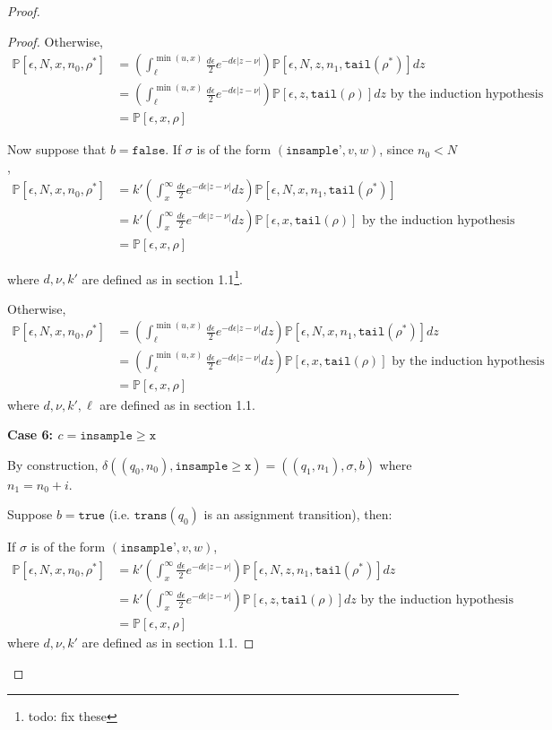 \documentclass[12pt]{article}
\newcommand{\PP}{\mathbb{P}}
\newcommand{\gguard}{\texttt{insample}\geq \texttt{x}}
\theoremstyle{definition}
\begin{document}
\begin{proof}
\begin{proof}
	Otherwise, 
	\begin{align*}
		\PP[\epsilon, N, x, n_0, \rho^*] &= \left(\int_{\ell}^{\min(u, x)}\frac{d\epsilon}{2}e^{-d\epsilon|z-\nu|}\right)\PP[\epsilon, N, z, n_1, \texttt{tail}(\rho^*)]dz \\
		&= \left(\int_{\ell}^{\min(u, x)}\frac{d\epsilon}{2}e^{-d\epsilon|z-\nu|}\right)\PP[\epsilon, z, \texttt{tail}(\rho)]dz \text{ by the induction hypothesis }\\
		&= \PP[\epsilon, x, \rho]
	\end{align*}

	Now suppose that $b = \texttt{false}$. If $\sigma$ is of the form $(\texttt{insample'}, v, w)$, since $n_0 < N$, 
	\begin{align*}
		\PP[\epsilon, N, x, n_0, \rho^*] &= k'\left(\int_x^\infty\frac{d\epsilon}{2}e^{-d\epsilon|z-\nu|}dz\right)\PP[\epsilon, N, x, n_1, \texttt{tail}(\rho^*)]\\
		&= k'\left(\int_x^\infty\frac{d\epsilon}{2}e^{-d\epsilon|z-\nu|}dz\right)\PP[\epsilon, x, \texttt{tail}(\rho)] \text{ by the induction hypothesis }\\
		&= \PP[\epsilon, x, \rho]
	\end{align*}

	where $d, \nu, k'$ are defined as in section 1.1\footnote{todo: fix these}.

	Otherwise, 
	\begin{align*}
		\PP[\epsilon, N, x, n_0, \rho^*] &= \left(\int_{\ell}^{\min(u, x)}\frac{d\epsilon}{2}e^{-d\epsilon|z-\nu|}dz\right)\PP[\epsilon, N, x, n_1, \texttt{tail}(\rho^*)]dz \\
		&= \left(\int_{\ell}^{\min(u, x)}\frac{d\epsilon}{2}e^{-d\epsilon|z-\nu|}dz\right)\PP[\epsilon, x, \texttt{tail}(\rho)] \text{ by the induction hypothesis }\\
		&= \PP[\epsilon, x, \rho]
	\end{align*}
	where $d, \nu, k', \ell$ are defined as in section 1.1.

	\textbf{Case 6: $c = \gguard$}
	
	By construction, $\delta((q_0, n_0), \gguard) = ((q_1, n_1), \sigma, b)$ where $n_1 = n_0+i$. 

	Suppose $b = \texttt{true}$ (i.e. $\texttt{trans}(q_0)$ is an assignment transition), then:

	If $\sigma$ is of the form $(\texttt{insample'}, v, w)$, 
		\begin{align*}
			\PP[\epsilon, N, x, n_0, \rho^*] &= k'\left(\int_x^\infty\frac{d\epsilon}{2}e^{-d\epsilon|z-\nu|}\right)\PP[\epsilon, N, z, n_1, \texttt{tail}(\rho^*)]dz \\
			&= k'\left(\int_x^\infty\frac{d\epsilon}{2}e^{-d\epsilon|z-\nu|}\right)\PP[\epsilon, z, \texttt{tail}(\rho)]dz \text{ by the induction hypothesis }\\
			&= \PP[\epsilon, x, \rho]
		\end{align*}
	where $d, \nu, k'$ are defined as in section 1.1.
	

\end{proof}
\end{proof}
\end{document}

